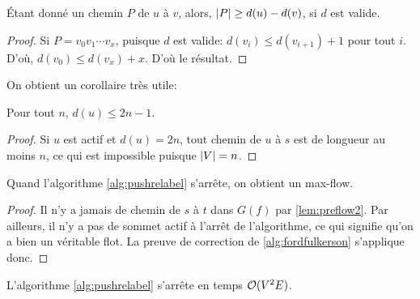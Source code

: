 \documentclass[math, info]{cours}
\begin{document}
\begin{lemme}
	Étant donné un chemin $P$ de $u$ à $v$, alors, $\left|P\right| \geq d(u) - d(v)$, si $d$ est valide.
	\label{lem:preflow2}
\end{lemme}
\begin{proof}
	Si $P = v_{0}v_{1}\cdots v_{x}$, puisque $d$ est valide: $d(v_{i}) \leq d(v_{i + 1}) + 1$ pour tout $i$.
	D'où, $d(v_{0}) \leq d(v_{x}) + x$.
	D'où le résultat.
\end{proof}

On obtient un corollaire très utile:
\begin{corollaire}
	Pour tout $n$, $d(u) \leq 2n - 1$.
	\label{cor:preflow1}
\end{corollaire}
\begin{proof}
	Si $u$ est actif et $d(u) = 2n$, tout chemin de $u$ à $s$ est de longueur au moins $n$, ce qui est impossible puisque $\left|V\right| = n$.
\end{proof}

\begin{thm}
	Quand l'algorithme \ref{alg:pushrelabel} s'arrête, on obtient un max-flow.
	\label{thm:pushrelabel}
\end{thm}
\begin{proof}
	Il n'y a jamais de chemin de $s$ à $t$ dans $G(f)$ par \ref{lem:preflow2}.
	Par ailleurs, il n'y a pas de sommet actif à l'arrêt de l'algorithme, ce qui signifie qu'on a bien un véritable flot.
	La preuve de correction de \ref{alg:fordfulkerson} s'applique donc.
\end{proof}

\begin{thm}
	L'algorithme \ref{alg:pushrelabel} s'arrête en temps $\mathcal{O}(V^{2}E)$.
\end{thm}
\end{document}
